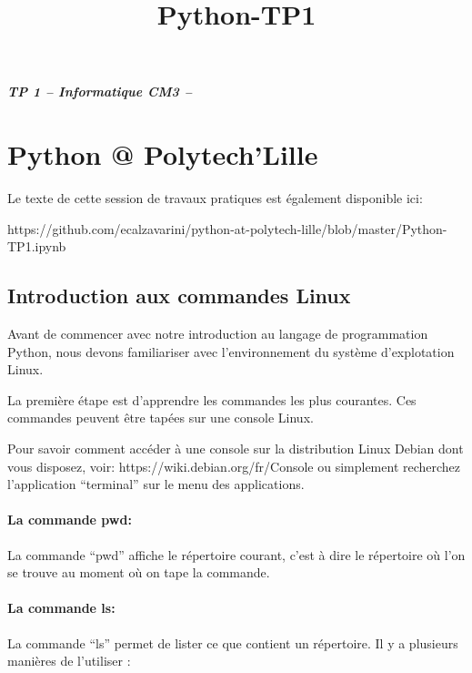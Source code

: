 \documentclass{article}
\title{Python-TP1}
\date{}
\begin{document}
    
    
    \maketitle
    
    

    
    \subparagraph{TP 1 -- Informatique CM3 --}\label{tp-1-informatique-cm3}

    \section{Python @ Polytech'Lille}\label{python-polytechlille}

    Le texte de cette session de travaux pratiques est également disponible
ici:

https://github.com/ecalzavarini/python-at-polytech-lille/blob/master/Python-TP1.ipynb

    \subsection{Introduction aux commandes
Linux}\label{introduction-aux-commandes-linux}

    Avant de commencer avec notre introduction au langage de programmation
Python, nous devons familiariser avec l'environnement du système
d'explotation Linux.

La première étape est d'apprendre les commandes les plus courantes. Ces
commandes peuvent être tapées sur une console Linux.

Pour savoir comment accéder à une console sur la distribution Linux
Debian dont vous disposez, voir: https://wiki.debian.org/fr/Console ou
simplement recherchez l'application ``terminal'' sur le menu des
applications.

    \paragraph{La commande pwd:}\label{la-commande-pwd}

    La commande ``pwd'' affiche le répertoire courant, c'est à dire le
répertoire où l'on se trouve au moment où on tape la commande.

    \paragraph{La commande ls:}\label{la-commande-ls}

    La commande ``ls'' permet de lister ce que contient un répertoire. Il y
a plusieurs manières de l'utiliser :
\end{document}
